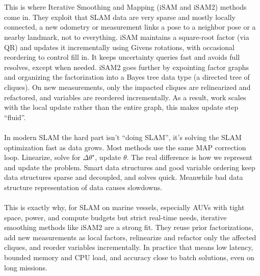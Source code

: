 \\ \\
This is where Iterative Smoothing and Mapping (\gls{iSAM} and \gls{iSAM}2) methods come in. They exploit that \gls{SLAM} data are very sparse and mostly locally connected, a new odometry or measurement links a pose to a neighbor pose or a nearby landmark, not to everything. \gls{iSAM} maintains a square-root factor (via QR) and updates it incrementally using Givens rotations, with occasional reordering to control fill in. It keeps uncertainty queries fast and avoids full resolves, except when needed. \gls{iSAM}2 goes further by expointing factor graphs and organizing the factorization into a Bayes tree data type (a directed tree of cliques). On new measurements, only the impacted cliques are relinearized and refactored, and variables are reordered incrementally. As a result, work scales with the local update rather than the entire graph, this makes update step ``fluid''.
\\ \\
In modern \gls{SLAM} the hard part isn't ``doing \gls{SLAM}'', it's solving the \gls{SLAM} optimization fast as data grows. Most methods use the same MAP correction loop. Linearize, solve for $\Delta\theta^\star$, update $\theta$. The real difference is how we represent and update the problem. Smart data structures and good variable ordering keep data structures sparse and decoupled, and solves quick. Meanwhile bad data structure representation of data causes slowdowns.
\\ \\
This is exactly why, for \gls{SLAM} on marine vessels, especially \gls{AUV}s with tight space, power, and compute budgets but strict real-time needs, iterative smoothing methods like \gls{iSAM}2 are a strong fit. They reuse prior factorizations, add new measurements as local factors, relinearize and refactor only the affected cliques, and reorder variables incrementally. In practice that means low latency, bounded memory and CPU load, and accuracy close to batch solutions, even on long missions.